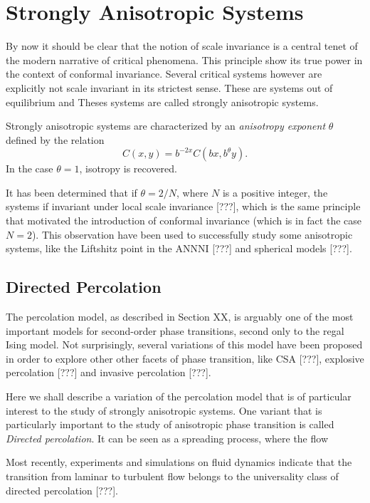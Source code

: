 \section{Strongly Anisotropic Systems}
\label{ch:anis}

By now it should be clear that the notion of scale invariance is a central
tenet of the modern narrative of critical phenomena. This principle show its
true power in the context of conformal invariance. Several critical systems
however are explicitly not scale invariant in its strictest sense. These are
systems out of equilibrium and Theses systems are called strongly anisotropic
systems.

Strongly anisotropic systems are characterized by an \textit{anisotropy
exponent} $\theta$ defined by the relation
\begin{equation}
    C(x, y) = b^{-2x}C(bx, b^\theta y).
\end{equation}
In the case $\theta=1$, isotropy is recovered.

It has been determined that if $\theta = 2/N$, where $N$ is a positive integer,
the systems if invariant under local scale invariance [???], which is the same
principle that motivated the introduction of conformal invariance (which is in
fact the case $N=2$). This observation have been used to successfully study
some anisotropic systems, like the Liftshitz point in the ANNNI [???] and
spherical models [???].


\subsection{Directed Percolation}
\label{sec:dp}

The percolation model, as described in Section XX, is arguably one of the most
important models for second-order phase transitions, second only to the regal
Ising model. Not surprisingly, several variations of this model have been
proposed in order to explore other other facets of phase transition, like CSA
[???], explosive percolation [???] and invasive percolation [???].

Here we shall describe a variation of the percolation model that is of
particular interest to the study of strongly anisotropic systems. One variant
that is particularly important to the study of anisotropic phase transition is
called \textit{Directed percolation}. It can be seen as a spreading process,
where the flow 

Most recently, experiments and simulations on fluid dynamics indicate
that the transition from laminar to turbulent flow belongs to the
universality class of directed percolation [???].

